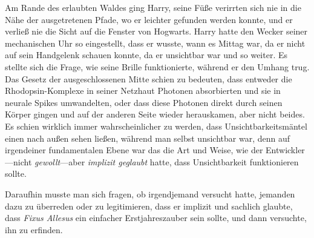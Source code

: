 Am Rande des erlaubten Waldes ging Harry, seine Füße verirrten sich nie in die Nähe der ausgetretenen Pfade, wo er leichter gefunden werden konnte, und er verließ nie die Sicht auf die Fenster von Hogwarts. Harry hatte den Wecker seiner mechanischen Uhr so eingestellt, dass er wusste, wann es Mittag war, da er nicht auf sein Handgelenk schauen konnte, da er unsichtbar war und so weiter. Es stellte sich die Frage, wie seine Brille funktionierte, während er den Umhang trug. Das Gesetz der ausgeschlossenen Mitte schien zu bedeuten, dass entweder die Rhodopsin-Komplexe in seiner Netzhaut Photonen absorbierten und sie in neurale Spikes umwandelten, oder dass diese Photonen direkt durch seinen Körper gingen und auf der anderen Seite wieder herauskamen, aber nicht beides. Es schien wirklich immer wahrscheinlicher zu werden, dass Unsichtbarkeitsmäntel einen nach außen sehen ließen, während man selbst unsichtbar war, denn auf irgendeiner fundamentalen Ebene war das die Art und Weise, wie der Entwickler—nicht \emph{gewollt}—aber \emph{implizit geglaubt} hatte, dass Unsichtbarkeit funktionieren sollte.

Daraufhin musste man sich fragen, ob irgendjemand versucht hatte, jemanden dazu zu überreden oder zu legitimieren, dass er implizit und sachlich glaubte, dass \emph{Fixus Allesus} ein einfacher Erstjahreszauber sein sollte, und dann versuchte, ihn zu erfinden.

